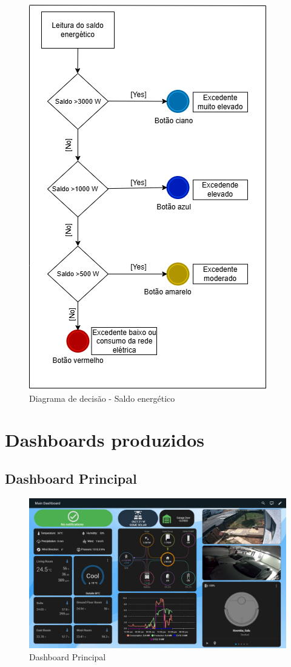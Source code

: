 \begin{figure}[H]
    \centering
    \includegraphics[height=0.4\textheight]{images/Saldo_Botao_Energetico_diagrama.drawio_2.png}
    \caption{Diagrama de decisão - Saldo energético}
    \label{fig:Saldo_Botao_Energetico_diagrama.drawio_2.png}
\end{figure}

\section{Dashboards produzidos}

\subsection{Dashboard Principal}

\begin{figure}[H]
    \centering
    \includegraphics[width=\textwidth]{images/principal.png}
    \caption{Dashboard Principal}
    \label{fig:principal.png}
\end{figure}

